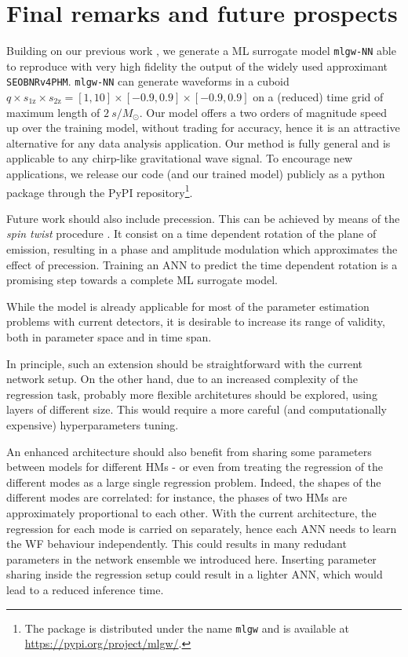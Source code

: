 \documentclass[twocolumn,showpacs,preprintnumbers,nofootinbib,prd,
superscriptaddress,10pt]{revtex4-1}
\begin{document}
{%

\section{Final remarks and future prospects}
\label{sec:end}

Building on our previous work \cite{Schmidt:2020yuu}, we generate a ML surrogate model \texttt{mlgw-NN} able to reproduce with very high fidelity the output of the widely used approximant \texttt{SEOBNRv4PHM}. \texttt{mlgw-NN} can generate waveforms in a cuboid $q\times s_\text{1z} \times s_\text{2z} = [1,10]\times[-0.9,0.9]\times[-0.9,0.9]$ on a (reduced) time grid of maximum length of $\SI{2}{s/M_\odot}$.
Our model offers a two orders of magnitude speed up over the training model, without trading for accuracy, hence it is an attractive alternative for any data analysis application.
Our method is fully general and is applicable to any chirp-like gravitational wave signal.
To encourage new applications, we release our code (and our trained model) publicly as a python package through the PyPI repository\footnote{The package is distributed under the name \texttt{mlgw} and is available at \url{https://pypi.org/project/mlgw/}.}.

Future work should also include precession. This can be achieved by means of the {\it spin twist} procedure \cite{Schmidt:2012rh, Schmidt:2014iyl, Pratten:2020ceb, Gamba:2021ydi}. It consist on a time dependent rotation of the plane of emission, resulting in a phase and amplitude modulation which approximates the effect of precession.
Training an ANN to predict the time dependent rotation is a promising step towards a complete ML surrogate model.

While the model is already applicable for most of the parameter estimation problems with current detectors, 
it is desirable to increase its range of validity, both in parameter space and in time span.

In principle, such an extension should be straightforward with the current network setup. On the other hand, due to an increased complexity of the regression task, probably more flexible architetures should be explored, using layers of different size. This would require a more careful (and computationally expensive) hyperparameters tuning.

An enhanced architecture should also benefit from sharing some parameters between models for different HMs - or even from treating the regression of the different modes as a large single regression problem. Indeed, the shapes of the different modes are correlated: for instance, the phases of two HMs are approximately proportional to each other. 
With the current architecture, the regression for each mode is carried on separately, hence each ANN needs to learn the WF behaviour independently. 
This could results in many redudant parameters in the network ensemble we introduced here.
Inserting parameter sharing inside the regression setup could result in a lighter ANN, which would lead to a reduced inference time.

}
\end{document}
